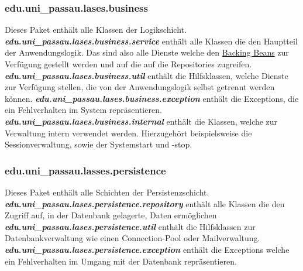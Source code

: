 \subsubsection{edu.uni\_passau.lases.business}\label{arch:business}
Dieses Paket enthält alle Klassen der Logikschicht.
\newline\newline
\textbf{\emph{edu.uni\_passau.lases.business.service}}\label{arch:service}
enthält alle Klassen die den Hauptteil der Anwendungslogik.
Das sind also alle Dienste welche den
\hyperref[arch:backing]{Backing Beans} zur Verfügung
gestellt werden und auf die auf die %
Repositories zugreifen.
\newline\newline
\textbf{\emph{edu.uni\_passau.lases.business.util}}
enthält die Hilfsklassen, welche Dienste zur Verfügung stellen,
die von der Anwendungslogik selbst getrennt werden können.
\newline\newline
\textbf{\emph{edu.uni\_passau.lases.business.exception}}
enthält die Exceptions, die ein Fehlverhalten im System repräsentieren.
\newline\newline
\textbf{\emph{edu.uni\_passau.lases.business.internal}}
enthält die Klassen, welche zur Verwaltung intern verwendet werden.
Hierzugehört beispielsweise die Sessionverwaltung, sowie der Systemstart und -stop.

\subsubsection{edu.uni\_passau.lasses.persistence}\label{arch:persistence}
Dieses Paket enthält alle Schichten der Persistenzschicht.
\newline\newline
\textbf{\emph{edu.uni\_passau.lases.persistence.repository}}
enthält alle Klassen die den Zugriff auf, in der Datenbank gelagerte,
Daten ermöglichen
\newline\newline
\textbf{\emph{edu.uni\_passau.lases.persistence.util}}
enthält die Hilfsklassen zur Datenbankverwaltung wie einen
Connection-Pool oder Mailverwaltung.
\newline\newline
\textbf{\emph{edu.uni\_passau.lases.persistence.exception}}
enthält die Exceptions welche ein Fehlverhalten im Umgang mit der
Datenbank repräsentieren.


